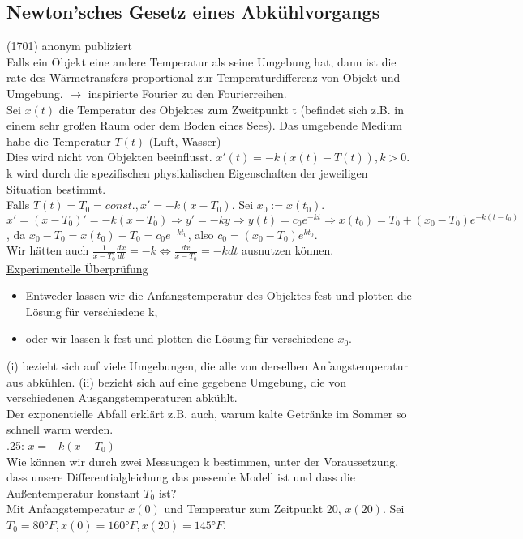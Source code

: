 \documentclass[12pt,a4paper]{article}
\newcommand{\DGL}{Differentialgleichung }
\begin{document}
\subsection{Newton'sches Gesetz eines Abkühlvorgangs}
(1701) anonym publiziert \\
Falls ein Objekt eine andere Temperatur als seine Umgebung hat, dann ist die rate des Wärmetransfers proportional zur Temperaturdifferenz von Objekt und Umgebung. $\rightarrow$ inspirierte Fourier zu den Fourierreihen. \\
Sei $x(t)$ die Temperatur des Objektes zum Zweitpunkt t (befindet sich z.B. in einem sehr großen Raum oder dem Boden eines Sees). Das umgebende Medium habe die Temperatur $T(t)$ (Luft, Wasser) \\
Dies wird nicht von Objekten beeinflusst. $x'(t) = -k (x(t) - T(t)), k > 0$. k wird durch die spezifischen physikalischen Eigenschaften der jeweiligen Situation bestimmt. \\
Falls $T(t) = T_0 = const., x'=-k(x-T_0)$. Sei $x_0 := x(t_0)$. $x'=(x-T_0)' = -k(x-T_0) \Rightarrow y'=-ky \Rightarrow y(t) = c_0e^{-kt} \Rightarrow x(t_0) = T_0 + (x_0 - T_0)e^{-k(t-t_0)}$, da $x_0-T_0 = x(t_0) - T_0 = c_0e^{-kt_0}$, also $c_0 = (x_0-T_0)e^{kt_0}$. \\
Wir hätten auch $\frac{1}{x-T_0} \frac{dx}{dt} = -k \Leftrightarrow \frac{dx}{x-T_0} = -kdt$ ausnutzen können. \\
\underline{Experimentelle Überprüfung}
\begin{itemize}
\item[(i)] Entweder lassen wir die Anfangstemperatur des Objektes fest und plotten die Lösung für verschiedene k,
\item[(ii)] oder wir lassen k fest und plotten die Lösung für verschiedene $x_0$.
\end{itemize}
(i) bezieht sich auf viele Umgebungen, die alle von derselben Anfangstemperatur aus abkühlen. (ii) bezieht sich auf eine gegebene Umgebung, die von verschiedenen Ausgangstemperaturen abkühlt. \\
Der exponentielle Abfall erklärt z.B. auch, warum kalte Getränke im Sommer so schnell warm werden. \\ .25: 
$x = -k(x-T_0)$ \\
Wie können wir durch zwei Messungen k bestimmen, unter der Voraussetzung, dass unsere \DGL das passende Modell ist und dass die Außentemperatur konstant $T_0$ ist? \\
Mit Anfangstemperatur $x(0)$ und Temperatur zum Zeitpunkt 20, $x(20)$. Sei $T_0=80\text{°}F, x(0) = 160\text{°}F, x(20) = 145\text{°}F$. \\
\end{document}
